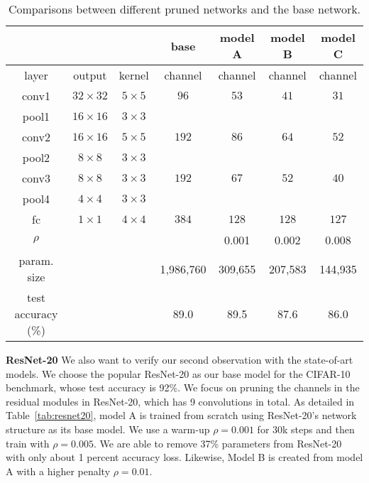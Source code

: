 \documentclass{article} %
\begin{document}
\begin{table}[htp]\centering
\begin{tabular}{ccccccc}
&&& base & model A & model B & model C\\\hline\hline
layer & output & kernel & channel & channel & channel & channel\\\hline
conv1 & $32\times 32$ & $5\times 5$ & $96$ & $53$ & $41$ & $31$ \\
pool1 & $16\times 16$ & $3\times 3$ \\
conv2 & $16\times 16$ & $5\times 5$ & $192$ & $86$ & $64$ & $52$\\
pool2 & $8 \times 8$  & $3\times 3$\\
conv3 & $8 \times 8$  & $3\times 3$ & $192$ & $67$ & $52$ & $40$\\
pool4 & $4 \times 4$  & $3\times 3$\\
fc    & $1 \times 1$  & $4\times 4$ & $384$ & $128$ & $128$ & $127$ \\\hline
$\rho$ &&&& 0.001 & 0.002 & 0.008 \\
param. size & & & 1,986,760 & 309,655 & 207,583 & 144,935\\
test accuracy (\%) & & & 89.0 & 89.5 & 87.6 & 86.0\\ \hline
\end{tabular}
\caption{Comparisons between different pruned networks and the base network.}\label{tab:convnet}
\end{table}

\textbf{ResNet-20} We also want to verify our second observation with the state-of-art models. 
We choose the popular ResNet-20 as our base model for the CIFAR-10 benchmark, whose 
test accuracy is 92\%. We focus on pruning the channels in the residual modules in ResNet-20,
which has 9 convolutions in total. As detailed in Table~\ref{tab:resnet20},
model A is trained from scratch using ResNet-20's network structure as its base model.
We use a warm-up $\rho=0.001$ for 30k steps and then 
train with $\rho=0.005$. We are able to remove 37\% parameters from ResNet-20 with only 
about 1 percent accuracy loss. 
Likewise, Model B is created from model A with a higher penalty $\rho=0.01$. 
\end{document}
